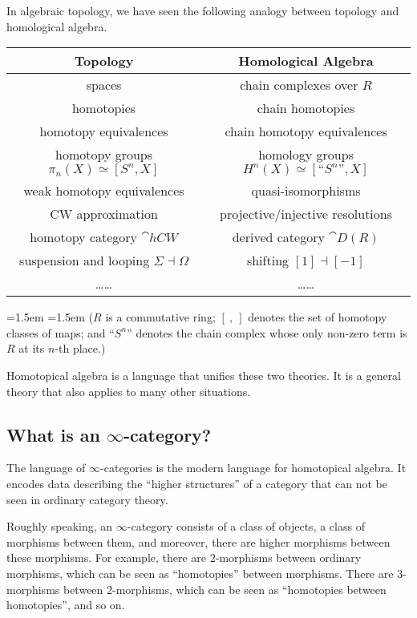 In algebraic topology,
we have seen the following analogy between topology and homological algebra.

\begin{center}
    \begin{tabular}{cc}
        \textbf{Topology} & \textbf{Homological Algebra} \\\hline
        spaces & chain complexes over $R$ \\
        homotopies & chain homotopies \\
        homotopy equivalences & chain homotopy equivalences \\
        homotopy groups $\pi_n(X)\simeq[S^n,X]$ & homology groups $H^n(X)\simeq[\text{``}S^n\text{''},X]$ \\
        weak homotopy equivalences & quasi-isomorphisms \\
        CW approximation & projective/injective resolutions \\
        homotopy category $\cat{hCW}$ & derived category $\cat{D}(R)$ \\
        suspension and looping $\Sigma\dashv\Omega$ & shifting $[1]\dashv[-1]$ \\
        \dots\dots & \dots\dots
    \end{tabular}%
    \medskip

    {\leftskip=1.5em \rightskip=1.5em \small
    ($R$ is a commutative ring;
    $[\ ,\ ]$ denotes the set of homotopy classes of maps;
    and ``$S^n$'' denotes the chain complex
    whose only non-zero term is $R$ at its $n$-th place.)

    }
\end{center}

Homotopical algebra is a language that unifies these two theories.
It is a general theory that also applies to many other situations.

\subsection{What is an \texorpdfstring{$\infty$}{∞}-category?}

The language of $\infty$-categories is the modern language for homotopical algebra.
It encodes data describing the ``higher structures'' of a category
that can not be seen in ordinary category theory.

Roughly speaking, an $\infty$-category consists of a class of objects,
a class of morphisms between them,
and moreover, there are higher morphisms between these morphisms.
For example, there are $2$-morphisms between ordinary morphisms,
which can be seen as ``homotopies'' between morphisms.
There are $3$-morphisms between $2$-morphisms,
which can be seen as ``homotopies between homotopies'', and so on.

